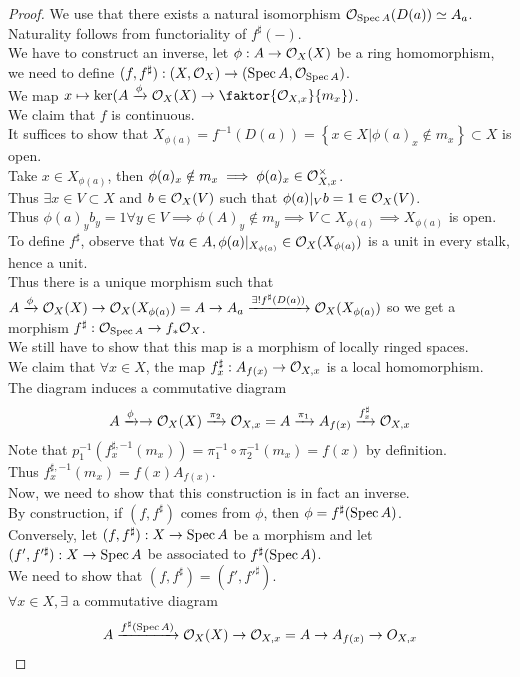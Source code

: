 \documentclass[../main.tex]{subfiles}
\begin{document}
\begin{proof}
We use that there exists a natural isomorphism $\mathcal{O}_{\operatorname{Spec} A} ( D( a) ) \simeq A_a$.\\
Naturality follows from functoriality of $f^{\sharp}( -) $.\\
We have to construct an inverse, let $\phi: A\to \mathcal{O}_X( X) $ be a ring homomorphism, we need to define $( f,f^{\sharp}) : ( X,\mathcal{O}_X) \to ( \operatorname{Spec} A, \mathcal{O}_{\operatorname{Spec} A} ) $.\\
We map $x\mapsto \ker ( A \xto\phi \O_X( X) \to \faktor{\O_{X,x} }{m_x}) $.\\
We claim that $f$ is continuous.\\
It suffices to show that $X_{\phi( a) } = f^{-1}( D( a) ) = \left\{ x\in X | \phi( a)_x \notin m_x \right\} \subset X$ is open.\\
Take $x\in X_{\phi( a) }$, then $\phi( a) _x\notin m_x \implies \phi( a) _x \in \mathcal{O}_{X,x} ^{\times} $.\\
Thus $\exists x \in V \subset X$ and $b \in \mathcal{O}_X( V) $ such that $\phi( a) |_V b = 1 \in \mathcal{O}_X( V) $.\\
Thus $\phi( a) _y b_y =1 \forall y \in V\implies \phi( A) _y \notin m_y \implies V \subset X_{\phi( a) } \implies X_{\phi( a) } $ is open.\\
To define $f^{\sharp}$, observe that $\forall a \in A, \phi( a) |_{X_{\phi( a) } } \in \mathcal{O}_X( X_{\phi( a) } ) $ is a unit in every stalk, hence a unit.\\
Thus there is a unique morphism such that $ A \xrightarrow{\phi} \mathcal{O}_X( X) \to \mathcal{O}_X( X_{\phi( a) } ) = A \to A_a \xrightarrow{\exists!f^{\sharp}( D( a) ) } \mathcal{O}_X( X_{\phi( a) } )  $ so we get a morphism $f^{\sharp}: \mathcal{O}_{\operatorname{Spec} A} \to f_\ast \mathcal{O}_X$.\\
We still have to show that this map is a morphism of locally ringed spaces.\\
We claim that $\forall x \in X$, the map $f^{\sharp}_x : A_{f( x) } \to \mathcal{O}_{X,x} $ is a local homomorphism.\\
The diagram induces a commutative diagram 
\[ 
	A\xrightarrow{\phi} \to \mathcal{O}_X( X) \xrightarrow{ \pi_2 } \mathcal{O}_{X,x} = A \xrightarrow{ \pi_1 } A_{f( x) } \xrightarrow{f_x^{\sharp}} \mathcal{O}_{X,x} 
\]
Note that $p_1^{-1}( f_x^{\sharp,-1}( m_x) ) = \pi_1^{-1}\circ \pi_2^{-1}( m_x) = f( x) $ by definition.\\
Thus $f_x^{\sharp,-1}( m_x) = f( x) A_{f( x) } $.\\
Now, we need to show that this construction is in fact an inverse.\\
By construction, if $( f,f^{\sharp}) $ comes from $\phi$, then $\phi= f^{\sharp}( \operatorname{Spec} A) $.\\
Conversely, let $( f,f^{\sharp}) : X\to \operatorname{Spec} A$ be a morphism and let $( f',f'^{\sharp}) :X\to \operatorname{Spec} A$ be associated to $f^{\sharp}( \operatorname{Spec} A) $.\\
We need to show that $( f,f^{\sharp}) = ( f',f'^{\sharp}) $.\\
 $\forall x \in X,\exists$ a commutative diagram
	\[ 
		A \xrightarrow{f^{\sharp}( \operatorname{Spec} A)} \mathcal{O}_X( X) \to \mathcal{O}_{X,x} = A \to A_{f( x) } \to O_{X,x} 
	\]
	

\end{proof}
\end{document}
